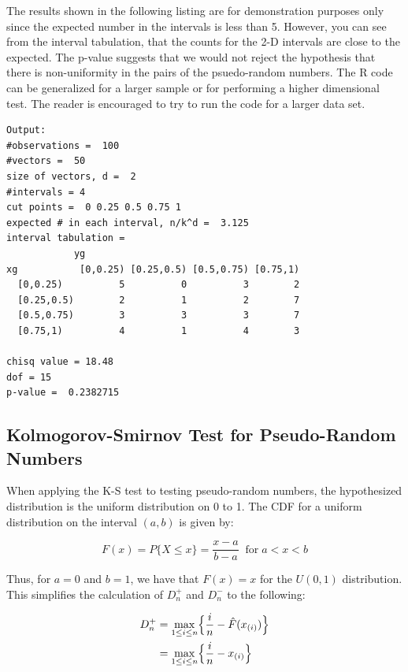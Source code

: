 \documentclass[
]{book}
\theoremstyle{definition}
\theoremstyle{definition}
\theoremstyle{definition}
\theoremstyle{definition}
\theoremstyle{remark}
\begin{document}
The results shown in the following listing are for demonstration purposes only since the
expected number in the intervals is less than 5. However, you can see
from the interval tabulation, that the counts for the 2-D intervals are
close to the expected. The p-value suggests that we would not reject the
hypothesis that there is non-uniformity in the pairs of the psuedo-random numbers. The R
code can be generalized for a larger sample or for performing a higher
dimensional test. The reader is encouraged to try to run the code for a
larger data set.

\begin{verbatim}
Output:
#observations =  100 
#vectors =  50 
size of vectors, d =  2 
#intervals = 4 
cut points =  0 0.25 0.5 0.75 1 
expected # in each interval, n/k^d =  3.125 
interval tabulation = 
            yg
xg           [0,0.25) [0.25,0.5) [0.5,0.75) [0.75,1)
  [0,0.25)          5          0          3        2
  [0.25,0.5)        2          1          2        7
  [0.5,0.75)        3          3          3        7
  [0.75,1)          4          1          4        3

chisq value = 18.48 
dof = 15 
p-value =  0.2382715 
\end{verbatim}

\hypertarget{kolmogorov-smirnov-test-for-pseudo-random-numbers}{%
\subsection{Kolmogorov-Smirnov Test for Pseudo-Random Numbers}\label{kolmogorov-smirnov-test-for-pseudo-random-numbers}}

When applying the K-S test to testing pseudo-random numbers, the
hypothesized distribution is the uniform distribution on 0 to 1. The CDF
for a uniform distribution on the interval \((a, b)\) is given by:

\[F(x) = P \lbrace X \leq x \rbrace = \frac{x-a}{b-a} \; \; \text{for} \; a < x < b\]

Thus, for \(a=0\) and \(b=1\), we have that \(F(x) = x\) for the \(U(0,1)\)
distribution. This simplifies the calculation of \(D^{+}_{n}\) and
\(D^{-}_{n}\) to the following:

\[
\begin{aligned}
 D^{+}_{n} & = \underset{1 \leq i \leq n}{\max} \Bigl\lbrace \frac{i}{n} -  \hat{F}(x_{(i)}) \Bigr\rbrace \\
     & = \underset{1 \leq i \leq n}{\max} \Bigl\lbrace \frac{i}{n} -  x_{(i)}\Bigr\rbrace
\end{aligned}
\]
\end{document}
